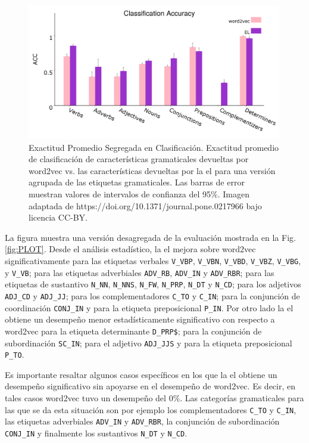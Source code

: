 {\begin{figure}[ht!]
    \centering
    \includegraphics[width=0.99\textwidth]{PLOT3.png}
    \caption{Exactitud Promedio Segregada en Clasificación. Exactitud promedio de clasificación de características gramaticales devueltas por word2vec vs. las características devueltas por la \gls{el} para una versión agrupada de las etiquetas gramaticales. Las barras de error muestran valores de intervalos de confianza del 95\%. Imagen adaptada de https://doi.org/10.1371/journal.pone.0217966 bajo licencia CC-BY.}
    \label{fig:PLOT3}
\end{figure}

La figura muestra una versión desagregada de la evaluación mostrada en la Fig. \ref{fig:PLOT}.
Desde el análisis estadístico, la \gls{el} mejora sobre word2vec significativamente para las etiquetas verbales
\texttt{V\_VBP}, \texttt{V\_VBN}, \texttt{V\_VBD}, \texttt{V\_VBZ}, \texttt{V\_VBG}, y \texttt{V\_VB};
para las etiquetas adverbiales \texttt{ADV\_RB}, \texttt{ADV\_IN} y \texttt{ADV\_RBR};
para las etiquetas de sustantivo \texttt{N\_NN}, \texttt{N\_NNS}, \texttt{N\_FW}, \texttt{N\_PRP}, \texttt{N\_DT} y \texttt{N\_CD};
para los adjetivos \texttt{ADJ\_CD} y \texttt{ADJ\_JJ};
para los complementadores \texttt{C\_TO}  y  \texttt{C\_IN}; para la conjunción de coordinación \texttt{CONJ\_IN} y para la etiqueta preposicional \texttt{P\_IN}.
Por otro lado la \gls{el} obtiene un desempeño menor estadísticamente significativo con respecto a word2vec para la etiqueta determinante
\texttt{D\_PRP\$}; para la conjunción de subordinación \texttt{SC\_IN}; para el adjetivo \texttt{ADJ\_JJS} y para la etiqueta preposicional \texttt{P\_TO}.

Es importante resaltar algunos casos específicos en los que la \gls{el} obtiene un desempeño significativo sin apoyarse en el desempeño de word2vec.
Es decir, en tales casos word2vec tuvo un desempeño del 0\%.
Las categorías gramaticales para las que se da esta situación son por ejemplo los complementadores \texttt{C\_TO} y  \texttt{C\_IN}, las etiquetas adverbiales \texttt{ADV\_IN} y \texttt{ADV\_RBR}, la conjunción de subordinación \texttt{CONJ\_IN} y finalmente los sustantivos \texttt{N\_DT} y \texttt{N\_CD}.


}
